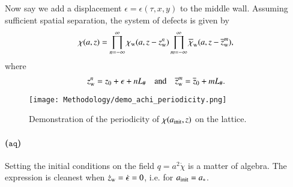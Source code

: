     Now say we add a displacement $\epsilon= \epsilon(\tau, x, y)$ to the middle wall. %
    Assuming sufficient spatial separation, the system of defects is given by
    \begin{equation}
        \chi(a,z) = \prod_{n= -\infty}^\infty \chi_\mathrm{w}(a, z- z_\mathrm{w}^{n} )\prod_{m=-\infty}^{\infty} {\overline{\chi}_\mathrm{w}(a, z-\overline{z}_\mathrm{w}^m) },
    \end{equation}
    where
    \begin{equation}\label{eq:PT:gwas:wall_antiwall_positions}
        z\ped{w}^n = z_0 + \epsilon + nL_\# %
        \quad\text{and}\quad %
        \widebar{z}\ped{w}^m = \widebar{z}_0+ mL_\#.
    \end{equation}
    \begin{figure}[h]
        \centering
        \texttt{[image: Methodology/demo\_achi\_periodicity.png]}
        \caption{Demonstration of the periodicity of $\chi(a_\mathrm{init},z)$ on the lattice. 
        }\label{fig:PT:gwas:demo_achi_periodicity}
    \end{figure}
    
    



    \paragraph{($\mathtt{aq}$)} %
    Setting the initial conditions on the field $q = a^2 \dot{\chi}$ is a matter of algebra. The expression is cleanest when $\dot{z}_\mathrm{w}=\dot{\epsilon}=0$, i.e. for $a_\mathrm{init}=a_\ast$. %


